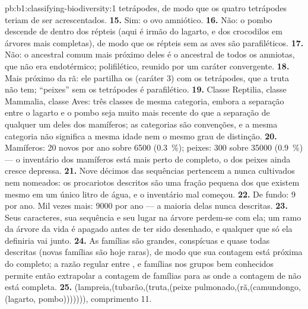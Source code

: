 \begin{solution}{pb:b1:classifying-biodiversity:1}
tetrápodes, de modo que os quatro tetrápodes teriam de ser
acrescentados.
\textbf{15.} Sim: o ovo amniótico.
\textbf{16.} Não: o pombo descende de dentro dos répteis (aqui é irmão
do lagarto, e dos crocodilos em árvores mais completas), de modo que
os répteis sem as aves são parafiléticos.
\textbf{17.} Não: o ancestral comum mais próximo deles é o ancestral de
todos os amniotas, que não era endotérmico; polifilético, reunido por
um caráter convergente.
\textbf{18.} Mais próximo da rã: ele partilha os  (caráter 3)
com os tetrápodes, que a truta não tem; ``peixes'' sem os tetrápodes é
parafilético.
\textbf{19.} Classe Reptilia, classe Mammalia, classe Aves: três
classes de mesma categoria, embora a separação entre o lagarto e o
pombo seja muito mais recente do que a separação de qualquer um deles
dos mamíferos; as categorias são convenções, e a mesma categoria não
significa a mesma idade nem o mesmo grau de distinção.
\textbf{20.} Mamíferos: \num{20} novos por ano sobre \num{6500}
(\qty{0.3}{\%}); peixes: \num{300} sobre \num{35000} (\qty{0.9}{\%})
--- o inventário dos mamíferos está mais perto de completo, o dos
peixes ainda cresce depressa.
\textbf{21.} Nove décimos das sequências pertencem a  nunca
cultivados nem nomeados: os procariotos descritos são uma fração
pequena dos que existem mesmo em um único litro de água, e o
inventário mal começou.
\textbf{22.} De fundo: \num{9} por ano. Mil vezes mais: \num{9000} por
ano --- a maioria delas  nunca descritas.
\textbf{23.} Seus caracteres, sua sequência e seu lugar na árvore
perdem-se com ela; um ramo da árvore da vida é apagado antes de ter
sido desenhado, e qualquer  que só ela definiria vai junto.
\textbf{24.} As famílias são grandes, conspícuas e quase todas
descritas (novas famílias são hoje raras), de modo que sua contagem
está próxima do completo; a razão regular entre ,  e
famílias nos grupos bem conhecidos permite então extrapolar a contagem
de famílias para as  onde a contagem de  não está
completa.
\textbf{25.} (lampreia,(tubarão,(truta,(peixe pulmonado,(rã,(camundongo,(lagarto,
pombo))))))), comprimento \num{11}.
\end{solution}
